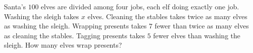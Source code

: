 Santa's $100$ elves are divided among four jobs, each elf doing exactly one job. Washing the sleigh takes $x$ elves. Cleaning the stables takes twice as many elves as washing the sleigh. Wrapping presents takes $7$ fewer than twice as many elves as cleaning the stables. Tagging presents takes $5$ fewer elves than washing the sleigh. How many elves wrap presents?
